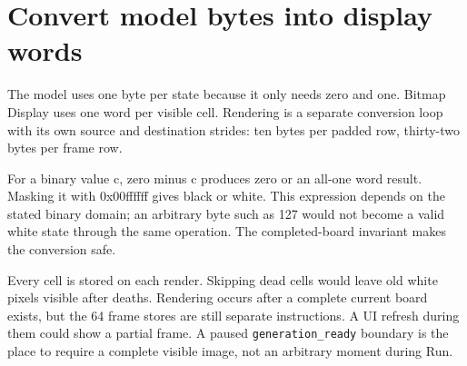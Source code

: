 \section{Convert model bytes into display
  words}\label{008-life-generations-p04-convert-model-bytes-into-display-words}

The model uses one byte per state because it only needs zero and one.
Bitmap Display uses one word per visible cell. Rendering is a separate
conversion loop with its own source and destination strides: ten bytes
per padded row, thirty-two bytes per frame row.

For a binary value c, zero minus c produces zero or an all-one word
result. Masking it with 0x00ffffff gives black or white. This expression
depends on the stated binary domain; an arbitrary byte such as 127 would
not become a valid white state through the same operation. The
completed-board invariant makes the conversion safe.

Every cell is stored on each render. Skipping dead cells would leave old
white pixels visible after deaths. Rendering occurs after a complete
current board exists, but the 64 frame stores are still separate
instructions. A UI refresh during them could show a partial frame. A
paused \texttt{generation\_ready} boundary is the place to require a
complete visible image, not an arbitrary moment during Run.
